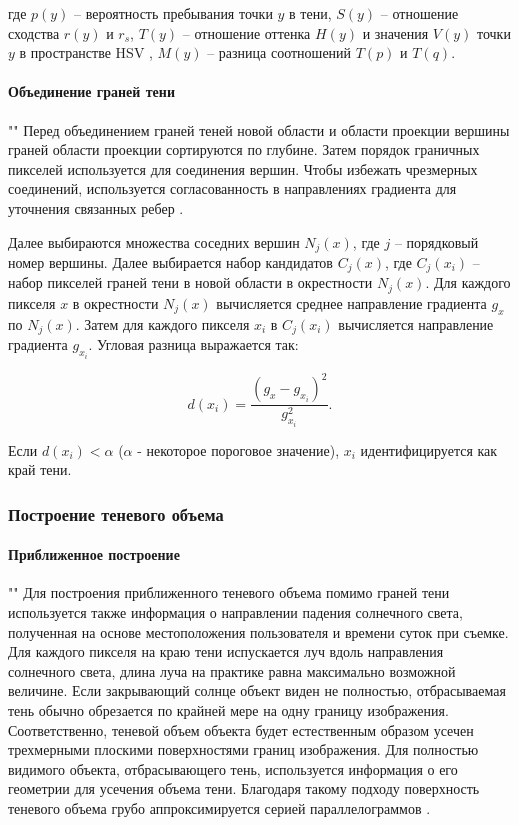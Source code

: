где $p(y)$ -- вероятность пребывания точки $y$ в тени, $S(y)$ -- отношение сходства $r(y)$ и $r_s$, $T(y)$ -- отношение оттенка $H(y)$ и значения $V(y)$ точки $y$ в пространстве HSV \cite{cheng2001color}, $M(y)$ -- разница соотношений $T(p)$ и $T(q)$.

\paragraph*{Объединение граней тени} 
""\newline\indent
Перед объединением граней теней новой области и области проекции вершины граней области проекции сортируются по глубине. Затем порядок граничных пикселей используется для соединения вершин. Чтобы избежать чрезмерных соединений, используется согласованность в направлениях градиента для уточнения связанных ребер \cite{wei2019simulating}.

Далее выбираются множества соседних вершин $N_j(x)$, где $j$ -- порядковый номер вершины. Далее выбирается набор кандидатов $C_j(x)$, где $C_j(x_i)$ -- набор пикселей граней тени в новой области в окрестности $N_j(x)$. Для каждого пикселя $x$ в окрестности $N_j(x)$ вычисляется среднее направление градиента $g_x$ по $N_j(x)$. Затем для каждого пикселя $x_i$ в $C_j(x_i)$ вычисляется направление градиента $g_{x_i}$. Угловая разница выражается так:

\begin{equation}
	d(x_i) = \frac{(g_x - g_{x_i}) ^ 2}{g_{x_i} ^ 2}.
\end{equation}

Если $d(x_i) < \alpha$ ($\alpha$ - некоторое пороговое значение), $x_i$ идентифицируется как край тени.

\subsubsection*{Построение теневого объема}

\paragraph*{Приближенное построение}
""\newline\indent
Для построения приближенного теневого объема помимо граней тени используется также информация о направлении падения солнечного света, полученная на основе местоположения пользователя и времени суток при съемке. Для каждого пикселя на краю тени испускается луч вдоль направления солнечного света, длина луча на практике равна максимально возможной величине. Если закрывающий солнце объект виден не полностью, отбрасываемая тень обычно обрезается по крайней мере на одну границу изображения. Соответственно,  теневой объем объекта будет естественным образом усечен трехмерными плоскими поверхностями границ изображения. Для полностью видимого объекта, отбрасывающего тень, используется информация о его геометрии для усечения объема тени. Благодаря такому подходу поверхность теневого объема грубо аппроксимируется серией параллелограммов \cite{wei2019simulating}.

